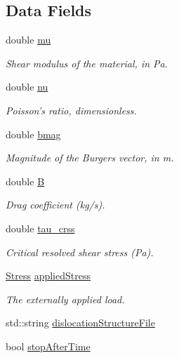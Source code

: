 \subsection*{\-Data \-Fields}
\begin{DoxyCompactItemize}
\item 
double \hyperlink{classParameter_a18c602586565fbc1ac773ef3e1bf46a4}{mu}
\begin{DoxyCompactList}\small\item\em \-Shear modulus of the material, in \-Pa. \end{DoxyCompactList}\item 
double \hyperlink{classParameter_ad1e17a52ea8a3481afc657cafb721d4e}{nu}
\begin{DoxyCompactList}\small\item\em \-Poisson's ratio, dimensionless. \end{DoxyCompactList}\item 
double \hyperlink{classParameter_a32658eea8eb0afef898daada83017143}{bmag}
\begin{DoxyCompactList}\small\item\em \-Magnitude of the \-Burgers vector, in m. \end{DoxyCompactList}\item 
double \hyperlink{classParameter_a5b9ced72f8fa0ff3100140e00174d351}{\-B}
\begin{DoxyCompactList}\small\item\em \-Drag coefficient (kg/s). \end{DoxyCompactList}\item 
double \hyperlink{classParameter_a043c7fdd972cc9f9a23e79ecdcdf7d4a}{tau\-\_\-crss}
\begin{DoxyCompactList}\small\item\em \-Critical resolved shear stress (\-Pa). \end{DoxyCompactList}\item 
\hyperlink{classStress}{\-Stress} \hyperlink{classParameter_a6027d6a064f705b3f95d194ff18f0cdd}{applied\-Stress}
\begin{DoxyCompactList}\small\item\em \-The externally applied load. \end{DoxyCompactList}\item 
std\-::string \hyperlink{classParameter_a6beb94fd77a5a3f73b87eeb942f2964a}{dislocation\-Structure\-File}
\item 
bool \hyperlink{classParameter_ae8af2b62df4db7df92e39a2c49a01c51}{stop\-After\-Time}

\end{DoxyCompactItemize}
